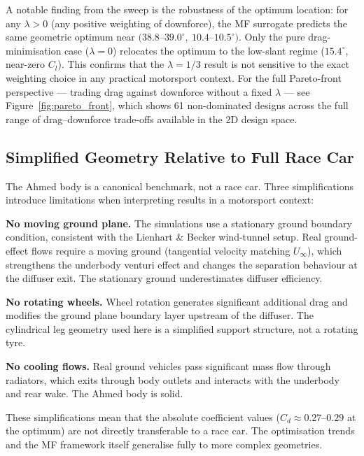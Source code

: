 A notable finding from the sweep is the robustness of the optimum location: for any $\lambda > 0$ (any positive weighting of downforce), the MF surrogate predicts the same geometric optimum near $(38.8$--$39.0^\circ,\ 10.4$--$10.5^\circ)$. Only the pure drag-minimisation case ($\lambda=0$) relocates the optimum to the low-slant regime ($15.4^\circ$, near-zero $C_l$). This confirms that the $\lambda = 1/3$ result is not sensitive to the exact weighting choice in any practical motorsport context. For the full Pareto-front perspective — trading drag against downforce without a fixed $\lambda$ — see Figure~\ref{fig:pareto_front}, which shows 61 non-dominated designs across the full range of drag--downforce trade-offs available in the 2D design space.

\subsection{Simplified Geometry Relative to Full Race Car}
\label{sec:ahmed_limits}

The Ahmed body is a canonical benchmark, not a race car. Three simplifications introduce limitations when interpreting results in a motorsport context:

\textbf{No moving ground plane.} The simulations use a stationary ground boundary condition, consistent with the Lienhart \& Becker \cite{lienhart2002} wind-tunnel setup. Real ground-effect flows require a moving ground (tangential velocity matching $U_\infty$), which strengthens the underbody venturi effect and changes the separation behaviour at the diffuser exit. The stationary ground underestimates diffuser efficiency.

\textbf{No rotating wheels.} Wheel rotation generates significant additional drag and modifies the ground plane boundary layer upstream of the diffuser. The cylindrical leg geometry used here is a simplified support structure, not a rotating tyre.

\textbf{No cooling flows.} Real ground vehicles pass significant mass flow through radiators, which exits through body outlets and interacts with the underbody and rear wake. The Ahmed body is solid.

These simplifications mean that the absolute coefficient values ($C_d \approx 0.27$--$0.29$ at the optimum) are not directly transferable to a race car. The optimisation trends and the MF framework itself generalise fully to more complex geometries.
